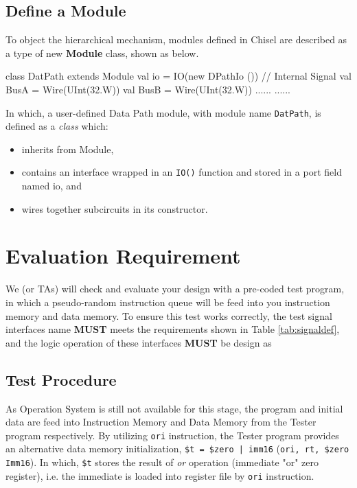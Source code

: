 \documentclass[a4paper]{article}
\def\code#1{{\tt #1}}
\begin{document}
\subsection{Define a Module} \label{sub:module}
To object the hierarchical mechanism, modules defined in Chisel are described as a type of new \textbf{Module} class, shown as below.
\begin{scala}
class DatPath extends Module {
	val io = IO(new DPathIo ())
	// Internal Signal
	val BusA 	= Wire(UInt(32.W))
	val BusB 	= Wire(UInt(32.W))
	......
	......
}
\end{scala}
In which, a user-defined Data Path module, with module name \code{DatPath}, is defined as a \textit{class} which:
\begin{itemize}
	\item inherits from Module,
	\item contains an interface wrapped in an \code{IO()} function and stored in a port field named io, and
	\item wires together subcircuits in its constructor.
\end{itemize}


\newpage
\section{Evaluation Requirement} \label{sec:Functions}%
We (or TAs) will check and evaluate your design with a pre-coded test program, in which a pseudo-random instruction queue will be feed into you instruction memory and data memory. To ensure this test works correctly, the test signal interfaces name \textbf{MUST} meets the requirements shown in Table \ref{tab:signaldef}, and the logic operation of these interfaces \textbf{MUST} be design as
\subsection{Test Procedure}\label{sub:TestProc}
As Operation System is still not available for this stage, the program and initial data are feed into Instruction Memory and Data Memory from the Tester program respectively. By utilizing \code{ori} instruction, the Tester program provides an alternative data memory initialization, \code{\$t = \$zero | imm16} (\code{ori, rt, \$zero Imm16}). In which, \code{\$t} stores the result of \textit{or} operation (immediate "or" zero register), i.e. the immediate is loaded into register file by \code{ori} instruction.
\end{document}
